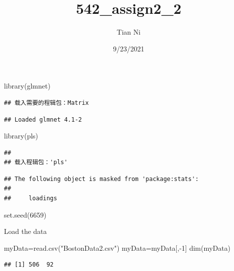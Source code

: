 \documentclass[
]{article}
\title{542\_assign2\_2}
\author{Tian Ni}
\date{9/23/2021}
\newenvironment{Shaded}{\begin{snugshade}}{\end{snugshade}}
\newcommand{\DecValTok}[1]{\textcolor[rgb]{0.00,0.00,0.81}{#1}}
\newcommand{\FunctionTok}[1]{\textcolor[rgb]{0.00,0.00,0.00}{#1}}
\newcommand{\NormalTok}[1]{#1}
\newcommand{\OtherTok}[1]{\textcolor[rgb]{0.56,0.35,0.01}{#1}}
\newcommand{\SpecialCharTok}[1]{\textcolor[rgb]{0.00,0.00,0.00}{#1}}
\newcommand{\StringTok}[1]{\textcolor[rgb]{0.31,0.60,0.02}{#1}}
\begin{document}
\maketitle

\begin{Shaded}
\begin{Highlighting}[]
\FunctionTok{library}\NormalTok{(glmnet)}
\end{Highlighting}
\end{Shaded}

\begin{verbatim}
## 载入需要的程辑包：Matrix
\end{verbatim}

\begin{verbatim}
## Loaded glmnet 4.1-2
\end{verbatim}

\begin{Shaded}
\begin{Highlighting}[]
\FunctionTok{library}\NormalTok{(pls)}
\end{Highlighting}
\end{Shaded}

\begin{verbatim}
## 
## 载入程辑包：'pls'
\end{verbatim}

\begin{verbatim}
## The following object is masked from 'package:stats':
## 
##     loadings
\end{verbatim}

\begin{Shaded}
\begin{Highlighting}[]
\FunctionTok{set.seed}\NormalTok{(}\DecValTok{6659}\NormalTok{)}
\end{Highlighting}
\end{Shaded}

Load the data

\begin{Shaded}
\begin{Highlighting}[]
\NormalTok{myData}\OtherTok{=}\FunctionTok{read.csv}\NormalTok{(}\StringTok{"BostonData2.csv"}\NormalTok{)}
\NormalTok{myData}\OtherTok{=}\NormalTok{myData[,}\SpecialCharTok{{-}}\DecValTok{1}\NormalTok{]}
\FunctionTok{dim}\NormalTok{(myData)}
\end{Highlighting}
\end{Shaded}

\begin{verbatim}
## [1] 506  92
\end{verbatim}
\end{document}
